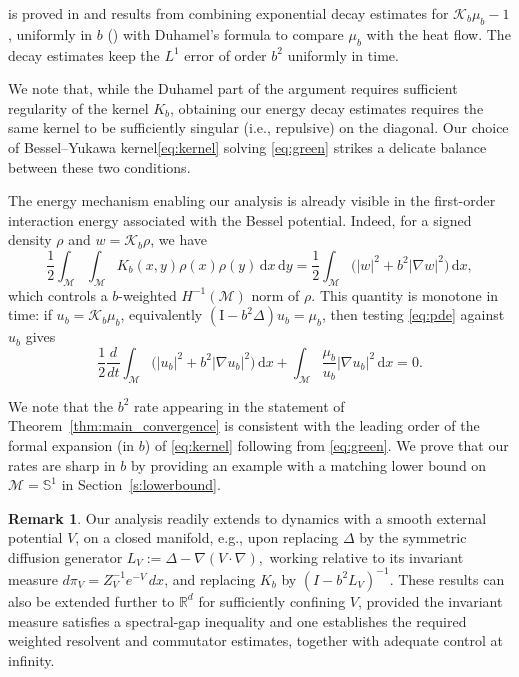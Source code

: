 \documentclass[11pt]{article}
\theoremstyle{definition}
\newtheorem{remark}[theorem]{Remark}
\def\Kb{\mathcal K_b}
\def\M{\mathcal M}
\def\d{\mathrm{d}}
\def\I{\mathrm{I}}
\begin{document}
 is proved in 
and results from combining exponential decay estimates for $\Kb\mu_b-1$,
uniformly in $b$ () with Duhamel's
formula to compare $\mu_b$ with the heat flow. The decay estimates
keep the $L^1$ error of order $b^2$ uniformly in time.

We note that, while the Duhamel part of the argument requires sufficient regularity of the kernel $K_b$, obtaining our energy decay estimates requires the same kernel to be sufficiently singular (i.e., repulsive) on the diagonal. Our choice of Bessel--Yukawa kernel\eqref{eq:kernel} solving \eqref{eq:green} strikes a delicate balance between these two conditions.

The energy mechanism enabling our analysis is already visible in the first-order interaction energy associated with the Bessel potential.
Indeed, for a signed density \(\rho\) and
\(w=\Kb\rho\), we have
\begin{equation}
\label{eq:interaction_energy}
\frac12\int_{\M}\int_{\M}K_b(x,y)\rho(x)\rho(y)\,\d x\,\d y
=
\frac12\int_{\M}\bigl(|w|^2+b^2|\nabla w|^2\bigr)\,\d x,
\end{equation}
which controls a \(b\)-weighted \(H^{-1}(\M)\) norm of $\rho$. 
This quantity is monotone in time: if
\(u_b=\Kb\mu_b\), equivalently \((\I-b^2\Delta)u_b=\mu_b\), then testing
\eqref{eq:pde} against \(u_b\) gives
\[
\frac12\frac{d}{dt}\int_{\M}\bigl(|u_b|^2+b^2|\nabla u_b|^2\bigr)\,\d x
+\int_{\M}\frac{\mu_b}{u_b}|\nabla u_b|^2\,\d x=0.
\]


We note that the $b^2$ rate appearing in the statement of Theorem~\ref{thm:main_convergence} is consistent with the leading order  of the formal expansion (in $b$) of \eqref{eq:kernel} following from \eqref{eq:green}. We prove that our rates are sharp in $b$ by providing an example with a matching lower bound on $\M = \mathbb S^1$ in Section~\ref{s:lowerbound}.
\begin{remark}
Our analysis readily extends to dynamics with a smooth external potential \(V\), on a closed manifold, e.g., upon replacing \(\Delta\) by the symmetric diffusion generator
$
L_V := \Delta - \nabla (V \cdot \nabla),
$
working relative to its invariant measure $d\pi_V = Z_V^{-1} e^{-V}\,dx$, and replacing \(K_b\) by \((I-b^2L_V)^{-1}\). These results can also be extended further to \(\mathbb{R}^d\) for sufficiently confining \(V\), provided the invariant measure satisfies a spectral-gap inequality and one establishes the required weighted resolvent and commutator estimates, together with adequate control at infinity. 
\end{remark}
\end{document}

